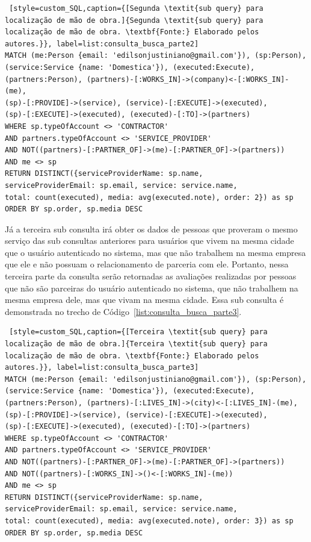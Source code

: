 \begin{lstlisting} [style=custom_SQL,caption={[Segunda \textit{sub query} para localização de mão de obra.]{Segunda \textit{sub query} para localização de mão de obra. \textbf{Fonte:} Elaborado pelos autores.}}, label=list:consulta_busca_parte2] 	
MATCH (me:Person {email: 'edilsonjustiniano@gmail.com'}), (sp:Person),
(service:Service {name: 'Domestica'}), (executed:Execute),
(partners:Person), (partners)-[:WORKS_IN]->(company)<-[:WORKS_IN]-(me),
(sp)-[:PROVIDE]->(service), (service)-[:EXECUTE]->(executed), 
(sp)-[:EXECUTE]->(executed), (executed)-[:TO]->(partners)
WHERE sp.typeOfAccount <> 'CONTRACTOR' 
AND partners.typeOfAccount <> 'SERVICE_PROVIDER'
AND NOT((partners)-[:PARTNER_OF]->(me)-[:PARTNER_OF]->(partners))
AND me <> sp
RETURN DISTINCT({serviceProviderName: sp.name, 
serviceProviderEmail: sp.email, service: service.name, 
total: count(executed), media: avg(executed.note), order: 2}) as sp 
ORDER BY sp.order, sp.media DESC
\end{lstlisting}

Já a terceira sub consulta irá obter os dados de pessoas que proveram o mesmo serviço das sub consultas anteriores para usuários que vivem na mesma cidade que o usuário autenticado no sistema, mas que não trabalhem na mesma empresa que ele e não possuam o relacionamento de parceria com ele. Portanto, nessa terceira parte da consulta serão retornadas as avaliações realizadas por pessoas que não são parceiras do usuário autenticado no sistema, que não trabalhem na mesma empresa dele, mas que vivam na mesma cidade. Essa sub consulta é demonstrada no trecho de Código~\ref{list:consulta_busca_parte3}.

\begin{lstlisting} [style=custom_SQL,caption={[Terceira \textit{sub query} para localização de mão de obra.]{Terceira \textit{sub query} para localização de mão de obra. \textbf{Fonte:} Elaborado pelos autores.}}, label=list:consulta_busca_parte3] 	
MATCH (me:Person {email: 'edilsonjustiniano@gmail.com'}), (sp:Person),
(service:Service {name: 'Domestica'}), (executed:Execute), 
(partners:Person), (partners)-[:LIVES_IN]->(city)<-[:LIVES_IN]-(me),
(sp)-[:PROVIDE]->(service), (service)-[:EXECUTE]->(executed), 
(sp)-[:EXECUTE]->(executed), (executed)-[:TO]->(partners)
WHERE sp.typeOfAccount <> 'CONTRACTOR' 
AND partners.typeOfAccount <> 'SERVICE_PROVIDER'
AND NOT((partners)-[:PARTNER_OF]->(me)-[:PARTNER_OF]->(partners))
AND NOT((partners)-[:WORKS_IN]->()<-[:WORKS_IN]-(me))
AND me <> sp
RETURN DISTINCT({serviceProviderName: sp.name, 
serviceProviderEmail: sp.email, service: service.name, 
total: count(executed), media: avg(executed.note), order: 3}) as sp 
ORDER BY sp.order, sp.media DESC 
\end{lstlisting}

